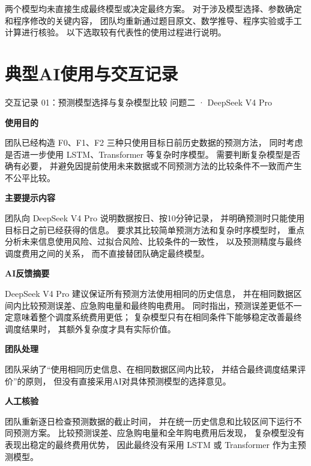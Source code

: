 \documentclass[UTF8,a4paper,11pt]{ctexart}
\newcommand{\recorditem}[1]{%
    \par\vspace{0.28em}
    \noindent\textbf{#1}\quad
}
\begin{document}
两个模型均未直接生成最终模型或决定最终方案。
对于涉及模型选择、参数确定和程序修改的关键内容，
团队均重新通过题目原文、数学推导、程序实验或手工计算进行核验。
以下选取较有代表性的使用过程进行说明。

\section{典型AI使用与交互记录}

\begin{recordbox}
{交互记录 01：预测模型选择与复杂模型比较}
{问题二 · DeepSeek V4 Pro}

\recorditem{使用目的}
团队已经构造 F0、F1、F2 三种只使用目标日前历史数据的预测方法，
同时考虑是否进一步使用 LSTM、Transformer 等复杂时序模型。
需要判断复杂模型是否确有必要，
并避免因提前使用未来数据或不同预测方法的比较条件不一致而产生不公平比较。

\recorditem{主要提示内容}
团队向 DeepSeek V4 Pro 说明数据按日、按10分钟记录，
并明确预测时只能使用目标日之前已经获得的信息。
要求其比较简单预测方法和复杂时序模型时，
重点分析未来信息使用风险、过拟合风险、比较条件的一致性，
以及预测精度与最终调度费用之间的关系，
而不直接替团队确定最终模型。

\recorditem{AI反馈摘要}
DeepSeek V4 Pro 建议保证所有预测方法使用相同的历史信息，
并在相同数据区间内比较预测误差、应急购电量和最终购电费用。
同时指出，预测误差更低不一定意味着整个调度系统费用更低；
复杂模型只有在相同条件下能够稳定改善最终调度结果时，
其额外复杂度才具有实际价值。

\recorditem{团队处理}
团队采纳了“使用相同历史信息、在相同数据区间内比较，
并结合最终调度结果评价”的原则，
但没有直接采用AI对具体预测模型的选择意见。

\recorditem{人工核验}
团队重新逐日检查预测数据的截止时间，
并在统一历史信息和比较区间下运行不同预测方案。
比较预测误差、应急购电量和全年购电费用后发现，
复杂模型没有表现出稳定的最终费用优势，
因此最终没有采用 LSTM 或 Transformer 作为主预测模型。

\end{recordbox}
\end{document}
